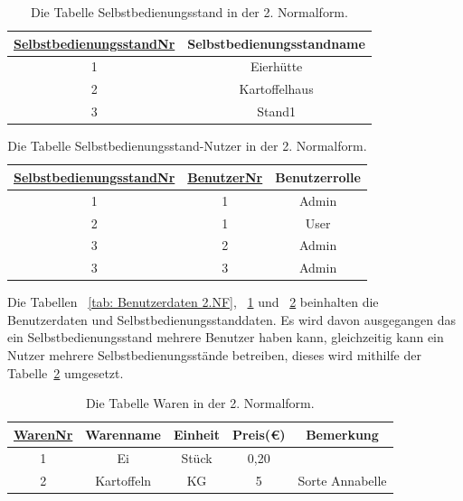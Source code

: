 \begin{table}[H]
	\centering
	\begin{tabular}{|c|c|}
		\hline
		\underline{SelbstbedienungsstandNr} & Selbstbedienungsstandname \\
		\hline
		1 & Eierhütte \\
		\hline
		2 & Kartoffelhaus \\
		\hline
		3 & Stand1 \\
		\hline
	\end{tabular}
	\caption{Die Tabelle Selbstbedienungsstand in der 2. Normalform.}
	\label{tab: Selbstbedienung 2.NF}
\end{table}

\begin{table}[H]
	\centering
	\begin{tabular}{|c|c|c|}
		\hline
		\underline{SelbstbedienungsstandNr} & \underline{BenutzerNr} & Benutzerrolle \\
		\hline
		1 & 1 &  Admin\\
		\hline
		2 & 1 &  User\\
		\hline
		3 & 2 &  Admin\\
		\hline
		3 & 3 &  Admin\\
		\hline
	\end{tabular}
	\caption{Die Tabelle Selbstbedienungsstand-Nutzer in der 2. Normalform.}
	\label{tab: Selbstbedienung-Nutzer 2.NF}
\end{table}

Die Tabellen ~\ref{tab: Benutzerdaten 2.NF}, ~\ref{tab: Selbstbedienung 2.NF} und ~\ref{tab: Selbstbedienung-Nutzer 2.NF} beinhalten die Benutzerdaten und Selbstbedienungsstanddaten. Es wird davon ausgegangen das ein Selbstbedienungsstand mehrere Benutzer haben kann, gleichzeitig kann ein Nutzer mehrere Selbstbedienungsstände betreiben, dieses wird mithilfe der Tabelle~\ref{tab: Selbstbedienung-Nutzer 2.NF} umgesetzt.

\begin{table}[H]
	\centering
	\begin{tabular}{|c|c|c|c|c|}
		\hline
		\underline{WarenNr} & Warenname & Einheit & Preis(€)& Bemerkung \\
		\hline
		1 & Ei & Stück &  0,20 & \\
		\hline
		2 & Kartoffeln & KG & 5 & Sorte Annabelle \\
		\hline
	\end{tabular}
	\caption{Die Tabelle Waren in der 2. Normalform.}
	\label{tab: Waren 2.NF}
\end{table}


